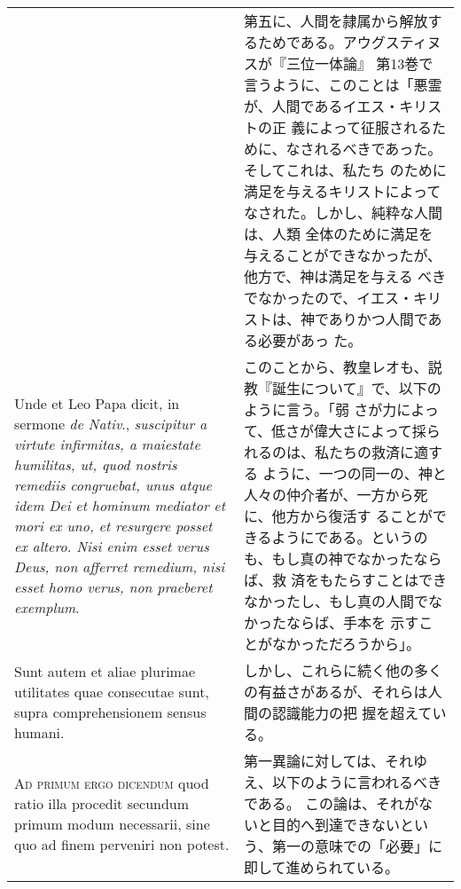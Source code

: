 \documentclass[10pt]{jsarticle} %
\begin{document}
\begin{longtable}{p{21em}p{21em}}
&

第五に、人間を隷属から解放するためである。アウグスティヌスが『三位一体論』
 第13巻で言うように、このことは「悪霊が、人間であるイエス・キリストの正
 義によって征服されるために、なされるべきであった。そしてこれは、私たち
のために満足を与えるキリストによってなされた。しかし、純粋な人間は、人類
 全体のために満足を与えることができなかったが、他方で、神は満足を与える
 べきでなかったので、イエス・キリストは、神でありかつ人間である必要があっ
 た。


\\



Unde
 et Leo Papa dicit, in sermone {\itshape de Nativ}., {\itshape suscipitur a virtute
 infirmitas, a maiestate humilitas, ut, quod nostris remediis
 congruebat, unus atque idem Dei et hominum mediator et mori ex uno, et
 resurgere posset ex altero. Nisi enim esset verus Deus, non afferret
 remedium, nisi esset homo verus, non praeberet exemplum}. 



&

このことから、教皇レオも、説教『誕生について』で、以下のように言う。「弱
 さが力によって、低さが偉大さによって採られるのは、私たちの救済に適する
 ように、一つの同一の、神と人々の仲介者が、一方から死に、他方から復活す
 ることができるようにである。というのも、もし真の神でなかったならば、救
 済をもたらすことはできなかったし、もし真の人間でなかったならば、手本を
 示すことがなかっただろうから」。

\\


Sunt autem et
 aliae plurimae utilitates quae consecutae sunt, supra comprehensionem
 sensus humani.


&

しかし、これらに続く他の多くの有益さがあるが、それらは人間の認識能力の把
 握を超えている。

\\



{\scshape Ad primum ergo dicendum} quod ratio illa procedit secundum primum modum necessarii, sine quo ad finem perveniri non potest.


&


第一異論に対しては、それゆえ、以下のように言われるべきである。
この論は、それがないと目的へ到達できないという、第一の意味での「必要」に
 即して進められている。


\\


\end{longtable}
\end{document}
